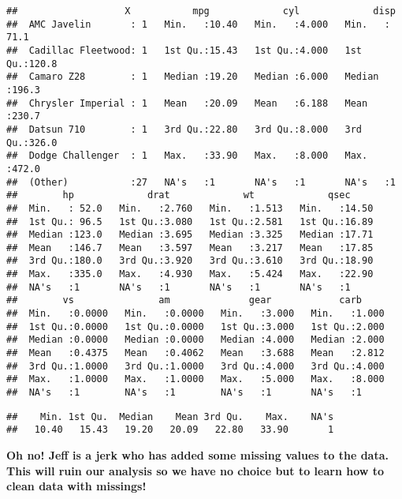 \documentclass[]{article}
\newenvironment{Shaded}{\begin{snugshade}}{\end{snugshade}}
\newcommand{\KeywordTok}[1]{\textcolor[rgb]{0.13,0.29,0.53}{\textbf{#1}}}
\newcommand{\CommentTok}[1]{\textcolor[rgb]{0.56,0.35,0.01}{\textit{#1}}}
\newcommand{\OperatorTok}[1]{\textcolor[rgb]{0.81,0.36,0.00}{\textbf{#1}}}
\newcommand{\NormalTok}[1]{#1}
\begin{document}
\begin{verbatim}
##                   X           mpg             cyl             disp      
##  AMC Javelin       : 1   Min.   :10.40   Min.   :4.000   Min.   : 71.1  
##  Cadillac Fleetwood: 1   1st Qu.:15.43   1st Qu.:4.000   1st Qu.:120.8  
##  Camaro Z28        : 1   Median :19.20   Median :6.000   Median :196.3  
##  Chrysler Imperial : 1   Mean   :20.09   Mean   :6.188   Mean   :230.7  
##  Datsun 710        : 1   3rd Qu.:22.80   3rd Qu.:8.000   3rd Qu.:326.0  
##  Dodge Challenger  : 1   Max.   :33.90   Max.   :8.000   Max.   :472.0  
##  (Other)           :27   NA's   :1       NA's   :1       NA's   :1      
##        hp             drat             wt             qsec      
##  Min.   : 52.0   Min.   :2.760   Min.   :1.513   Min.   :14.50  
##  1st Qu.: 96.5   1st Qu.:3.080   1st Qu.:2.581   1st Qu.:16.89  
##  Median :123.0   Median :3.695   Median :3.325   Median :17.71  
##  Mean   :146.7   Mean   :3.597   Mean   :3.217   Mean   :17.85  
##  3rd Qu.:180.0   3rd Qu.:3.920   3rd Qu.:3.610   3rd Qu.:18.90  
##  Max.   :335.0   Max.   :4.930   Max.   :5.424   Max.   :22.90  
##  NA's   :1       NA's   :1       NA's   :1       NA's   :1      
##        vs               am              gear            carb      
##  Min.   :0.0000   Min.   :0.0000   Min.   :3.000   Min.   :1.000  
##  1st Qu.:0.0000   1st Qu.:0.0000   1st Qu.:3.000   1st Qu.:2.000  
##  Median :0.0000   Median :0.0000   Median :4.000   Median :2.000  
##  Mean   :0.4375   Mean   :0.4062   Mean   :3.688   Mean   :2.812  
##  3rd Qu.:1.0000   3rd Qu.:1.0000   3rd Qu.:4.000   3rd Qu.:4.000  
##  Max.   :1.0000   Max.   :1.0000   Max.   :5.000   Max.   :8.000  
##  NA's   :1        NA's   :1        NA's   :1       NA's   :1
\end{verbatim}

\begin{Shaded}
\end{Shaded}

\begin{verbatim}
##    Min. 1st Qu.  Median    Mean 3rd Qu.    Max.    NA's 
##   10.40   15.43   19.20   20.09   22.80   33.90       1
\end{verbatim}

\textbf{Oh no! Jeff is a jerk who has added some missing values to the
data. This will ruin our analysis so we have no choice but to learn how
to clean data with missings!}
\end{document}
